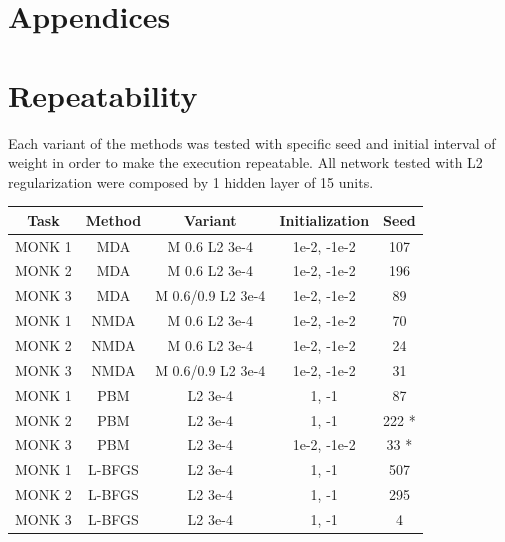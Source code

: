 \appendix
{}
\section*{Appendices}
\section{Repeatability}
Each variant of the methods was tested with specific seed and initial interval of weight in order to make the execution repeatable.
All network tested with L2 regularization were composed by 1 hidden layer of 15 units.
\begin{table}[H]
	\centering
	\begin{tabular}{|c|c|c|c|c|}
		\hline
		\textbf{Task} &	\textbf{Method} &\textbf{ Variant} & \textbf{Initialization} &\textbf{Seed} \\ \hline
		MONK 1        &    MDA & M  0.6 L2 3e-4 & 1e-2, -1e-2 & 107  \\ \hline
		MONK 2        &    MDA & M  0.6 L2 3e-4 & 1e-2, -1e-2 & 196  \\ \hline
		MONK 3        &    MDA & M  0.6/0.9 L2 3e-4 & 1e-2, -1e-2 & 89  \\ \hline
		MONK 1        &    NMDA & M  0.6 L2 3e-4 & 1e-2, -1e-2 & 70  \\ \hline
		MONK 2        &    NMDA & M  0.6 L2 3e-4 & 1e-2, -1e-2 & 24  \\ \hline
		MONK 3        &    NMDA & M  0.6/0.9 L2 3e-4 & 1e-2, -1e-2 & 31  \\ \hline
		MONK 1        &    PBM  & L2 3e-4 & 1, -1 & 87  \\ \hline
		MONK 2        &    PBM & L2 3e-4 & 1, -1 & 222 *  \\ \hline
		MONK 3        &    PBM & L2 3e-4 & 1e-2, -1e-2 & 33 *  \\ \hline
		MONK 1        &    L-BFGS & L2 3e-4 & 1, -1 & 507  \\ \hline
		MONK 2        &    L-BFGS & L2 3e-4 & 1, -1 & 295  \\ \hline
		MONK 3        &    L-BFGS & L2 3e-4 & 1, -1 & 4  \\ \hline
		

\end{tabular}
\end{table}
